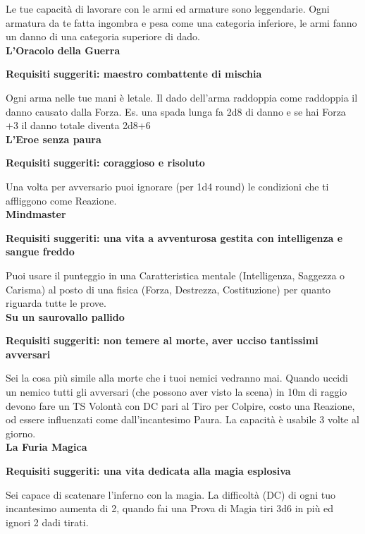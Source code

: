 \begin{multicols}{2}
Le tue capacità di lavorare con le armi ed armature sono leggendarie.
Ogni armatura da te fatta ingombra e pesa come una categoria inferiore, le armi fanno un danno di una categoria superiore di dado.\\

\Large\textbf{L'Oracolo della Guerra}\normalsize{}

\textbf{Requisiti suggeriti: maestro combattente di mischia}

Ogni arma nelle tue mani è letale. Il dado dell'arma raddoppia come raddoppia il danno causato dalla Forza. Es. una spada lunga fa 2d8 di danno e se hai Forza +3 il danno totale diventa 2d8+6\\

\Large\textbf{L'Eroe senza paura}\normalsize{}

\textbf{Requisiti suggeriti: coraggioso e risoluto}

Una volta per avversario puoi ignorare (per 1d4 round) le condizioni che ti affliggono come Reazione.\\

\Large\textbf{Mindmaster}\normalsize{}

\textbf{Requisiti suggeriti: una vita a avventurosa gestita con intelligenza e sangue freddo}

Puoi usare il punteggio in una Caratteristica mentale (Intelligenza, Saggezza o Carisma) al posto di una fisica (Forza, Destrezza, Costituzione) per quanto riguarda tutte le prove.\\

\Large\textbf{Su un saurovallo pallido}\normalsize{}

\textbf{Requisiti suggeriti: non temere al morte, aver ucciso tantissimi avversari}

Sei la cosa più simile alla morte che i tuoi nemici vedranno mai.
Quando uccidi un nemico tutti gli avversari (che possono aver visto la scena) in 10m di raggio devono fare un TS Volontà con DC pari al Tiro per Colpire, costo una Reazione, od essere influenzati come dall'incantesimo Paura. La capacità è usabile 3 volte al giorno.\\

\Large\textbf{La Furia Magica}\normalsize{}

\textbf{Requisiti suggeriti: una vita dedicata alla magia esplosiva}

Sei capace di scatenare l'inferno con la magia. La difficoltà (DC) di ogni tuo incantesimo aumenta di 2, quando fai una Prova di Magia tiri 3d6 in più ed ignori 2 dadi tirati.\\


\end{multicols}
